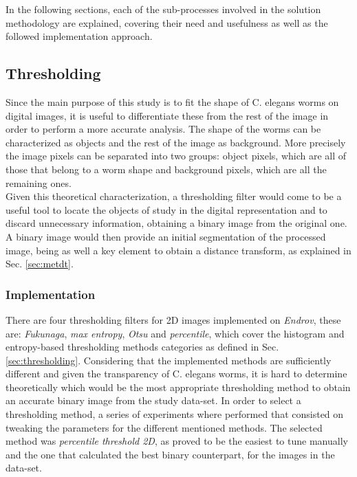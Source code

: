 In the following sections, each of the sub-processes involved in the solution
methodology are explained, covering their need and usefulness as
well as the followed implementation approach.

  

\subsection{Thresholding}
\label{sec:metthres}

Since the main purpose of this study is to fit the shape of C. elegans worms on digital
images, it is useful to differentiate these from the rest of the image in order to perform a more 
accurate analysis. The shape of the worms
can be characterized as objects and the rest of the image as background. More precisely
the image pixels can be separated into two groups: object pixels, which are all of those
that belong to a worm shape and background pixels, which are all the remaining ones.\\

Given this theoretical characterization, a thresholding filter would come to be a useful tool 
to locate the objects of study in the digital representation and to discard unnecessary 
information, obtaining a binary image from the original one. A binary image would then provide
an initial segmentation of the processed image, being as well a key element to obtain
a distance transform, as explained in Sec. \ref{sec:metdt}.

\subsubsection{Implementation}
\label{sec:thresimp}
There are four thresholding filters for 2D images implemented on \emph{Endrov}, these are: 
\emph{Fukunaga}, \emph{max entropy}, \emph{Otsu} and \emph{percentile}, which cover the 
histogram and entropy-based thresholding methods categories as defined in Sec.\ref{sec:thresholding}.
Considering that the implemented methods are sufficiently different and given the transparency
of C. elegans worms, it is hard to determine theoretically which would be the most appropriate 
thresholding method to obtain an accurate binary image from the study data-set. In order 
to select a thresholding method, a series of experiments where performed that consisted on 
tweaking the parameters for the different mentioned methods. 
The selected method was \emph{percentile threshold 2D}, as proved to be the easiest to tune manually and the 
one that calculated the best binary counterpart, for the images in the data-set.

